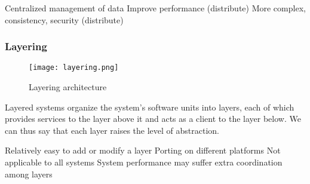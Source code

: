 \begin{itemize}
    \proitem{} Centralized management of data
    \proitem{} Improve performance (distribute)
    \consitem{} More complex, consistency, security (distribute)
\end{itemize}

\subsubsection{Layering}

\begin{figure}[!ht]
    \centering
    \texttt{[image: layering.png]}
    \caption{Layering architecture}
\end{figure}

Layered systems organize the system’s software units into layers, each of which
provides services to the layer above it and acts as a client to the layer below.
We can thus say that each layer raises the level of abstraction.

\begin{itemize}
    \proitem{} Relatively easy to add or modify a layer
    \proitem{} Porting on different platforms
    \consitem{} Not applicable to all systems
    \consitem{} System performance may suffer extra coordination among layers
\end{itemize}
